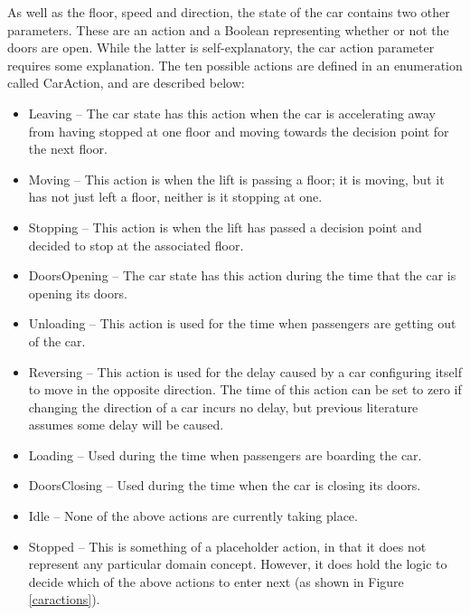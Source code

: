 \documentclass{UoYCSproject}
\begin{document}
As well as the floor, speed and direction, the state of the car contains two other parameters.  These are an action and a Boolean representing whether or not the doors are open.  While the latter is self-explanatory, the car action parameter requires some explanation.  The ten possible actions are defined in an enumeration called CarAction, and are described below:
\begin{itemize}
	\item Leaving -- The car state has this action when the car is accelerating away from having stopped at one floor and moving towards the decision point for the next floor.
	\item Moving -- This action is when the lift is passing a floor; it is moving, but it has not just left a floor, neither is it stopping at one.
	\item Stopping -- This action is when the lift has passed a decision point and decided to stop at the associated floor.
	\item DoorsOpening -- The car state has this action during the time that the car is opening its doors.
	\item Unloading -- This action is used for the time when passengers are getting out of the car.
	\item Reversing -- This action is used for the delay caused by a car configuring itself to move in the opposite direction.  The time of this action can be set to zero if changing the direction of a car incurs no delay, but previous literature assumes some delay will be caused.
	\item Loading -- Used during the time when passengers are boarding the car.
	\item DoorsClosing -- Used during the time when the car is closing its doors.
	\item Idle -- None of the above actions are currently taking place.
	\item Stopped -- This is something of a placeholder action, in that it does not represent any particular domain concept.  However, it does hold the logic to decide which of the above actions to enter next (as shown in Figure \ref{caractions}).
\end{itemize}
\end{document}
